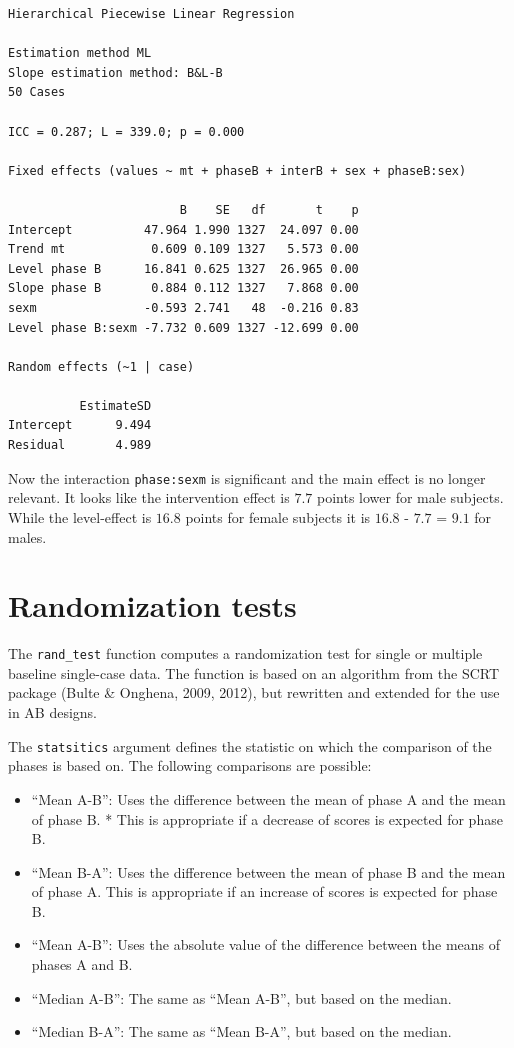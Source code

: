 \documentclass[
]{book}
\providecommand{\tightlist}{%
  \setlength{\itemsep}{0pt}\setlength{\parskip}{0pt}}
\begin{document}
\begin{verbatim}
Hierarchical Piecewise Linear Regression

Estimation method ML 
Slope estimation method: B&L-B 
50 Cases

ICC = 0.287; L = 339.0; p = 0.000

Fixed effects (values ~ mt + phaseB + interB + sex + phaseB:sex)

                        B    SE   df       t    p
Intercept          47.964 1.990 1327  24.097 0.00
Trend mt            0.609 0.109 1327   5.573 0.00
Level phase B      16.841 0.625 1327  26.965 0.00
Slope phase B       0.884 0.112 1327   7.868 0.00
sexm               -0.593 2.741   48  -0.216 0.83
Level phase B:sexm -7.732 0.609 1327 -12.699 0.00

Random effects (~1 | case)

          EstimateSD
Intercept      9.494
Residual       4.989
\end{verbatim}

Now the interaction \texttt{phase:sexm} is significant and the main effect is no longer relevant. It looks like the intervention effect is \(7.7\) points lower for male subjects. While the level-effect is \(16.8\) points for female subjects it is \(16.8\) - \(7.7\) = \(9.1\) for males.

\hypertarget{randomization-tests}{%
\chapter{Randomization tests}\label{randomization-tests}}

The \texttt{rand\_test} function computes a randomization test for single or multiple baseline single-case data. The function is based on an algorithm from the SCRT package (Bulte \& Onghena, 2009, 2012), but rewritten and extended for the use in AB designs.

The \texttt{statsitics} argument defines the statistic on which the comparison of the phases is based on. The following comparisons are possible:

\begin{itemize}
\tightlist
\item
  ``Mean A-B'': Uses the difference between the mean of phase A and the mean of phase B. * This is appropriate if a decrease of scores is expected for phase B.
\item
  ``Mean B-A'': Uses the difference between the mean of phase B and the mean of phase A. This is appropriate if an increase of scores is expected for phase B.
\item
  ``Mean \textbar A-B\textbar{}'': Uses the absolute value of the difference between the means of phases A and B.
\item
  ``Median A-B'': The same as ``Mean A-B'', but based on the median.
\item
  ``Median B-A'': The same as ``Mean B-A'', but based on the median.
\end{itemize}
\end{document}
